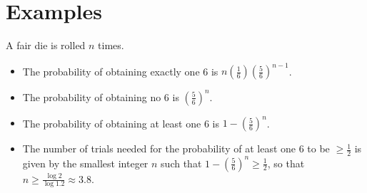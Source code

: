 \section{Examples}
\begin{example}
	A fair die is rolled $n$ times.
	\begin{itemize}
		\item The probability of obtaining exactly one 6 is $n\left(\frac{1}{6}\right)\left(\frac{5}{6}\right)^{n - 1}$.
		\item The probability of obtaining no 6 is $\left(\frac{5}{6}\right)^n$.
		\item The probability of obtaining at least one 6 is $1 - \left(\frac{5}{6}\right)^n$.
		\item The number of trials needed for the probability of at least one 6 to be $\geq \frac{1}{2}$ is given by the smallest integer $n$ such that $1 - \left(\frac{5}{6}\right)^n \geq \frac{1}{2}$, so that $n \geq \frac{\log 2}{\log 1.2} \approx 3.8$.
	\end{itemize}
\end{example}

